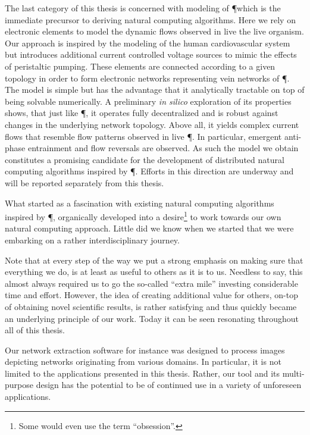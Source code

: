 	The last category of this thesis is concerned with modeling of \P which is the immediate precursor to deriving natural computing algorithms. Here we rely on electronic elements to model the dynamic flows observed in live the live organism. Our approach is inspired by the modeling of the human cardiovascular system but introduces additional current controlled voltage sources to mimic the effects of peristaltic pumping. These elements are connected according to a given topology in order to form electronic networks representing vein networks of \P. The model is simple but has the advantage that it analytically tractable on top of being solvable numerically. A preliminary \emph{in silico} exploration of its properties shows, that just like \P, it operates fully decentralized and is robust against changes in the underlying network topology. Above all, it yields complex current flows that resemble flow patterns observed in live \P. In particular, emergent anti-phase entrainment and flow reversals are observed. As such the model we obtain constitutes a promising candidate for the development of distributed natural computing algorithms inspired by \P. Efforts in this direction are underway and will be reported separately from this thesis.

	What started as a fascination with existing natural computing algorithms inspired by \P, organically developed into a desire\footnote{Some would even use the term ``obsession''.} to work towards our own natural computing approach. Little did we know when we started that we were embarking on a rather interdisciplinary journey.

	Note that at every step of the way we put a strong emphasis on making sure that everything we do, is at least as useful to others as it is to us. Needless to say, this almost always required us to go the so-called ``extra mile'' investing considerable time and effort. However, the idea of creating additional value for others, on-top of obtaining novel scientific results, is rather satisfying and thus quickly became an underlying principle of our work. Today it can be seen resonating throughout all of this thesis. 

	Our network extraction software \NEFI for instance was designed to process images depicting networks originating from various domains. In particular, it is not limited to the applications presented in this thesis. Rather, our tool and its multi-purpose design has the potential to be of continued use in a variety of unforeseen applications.

